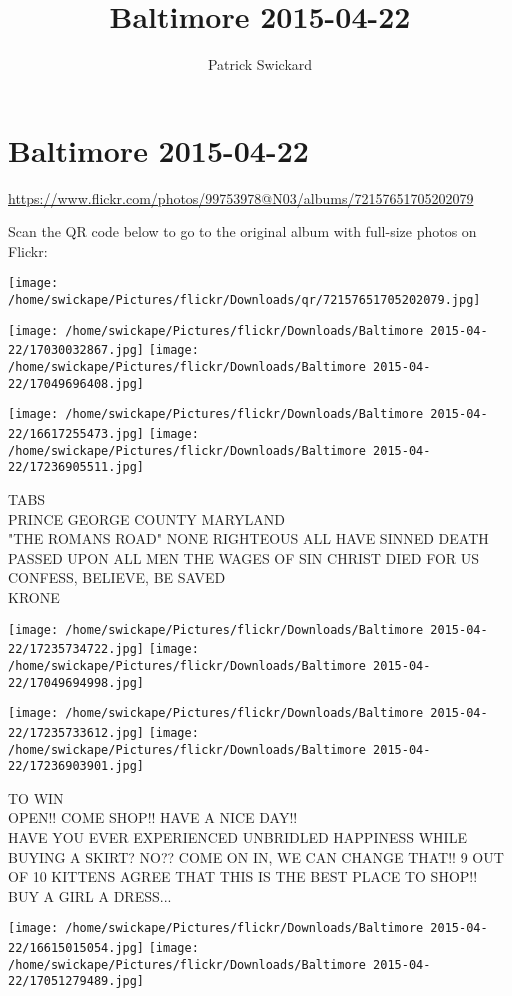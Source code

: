\documentclass[10pt,letterpaper]{article}
\title{Baltimore 2015-04-22}
\author{Patrick Swickard}
\date{}
\begin{document}
\section*{Baltimore 2015-04-22}

\url{https://www.flickr.com/photos/99753978@N03/albums/72157651705202079}

Scan the QR code below to go to the original album with full-size photos on Flickr:

\texttt{[image: /home/swickape/Pictures/flickr/Downloads/qr/72157651705202079.jpg]}
\pagebreak

\texttt{[image: /home/swickape/Pictures/flickr/Downloads/Baltimore 2015-04-22/17030032867.jpg]}
\texttt{[image: /home/swickape/Pictures/flickr/Downloads/Baltimore 2015-04-22/17049696408.jpg]}

\texttt{[image: /home/swickape/Pictures/flickr/Downloads/Baltimore 2015-04-22/16617255473.jpg]}
\texttt{[image: /home/swickape/Pictures/flickr/Downloads/Baltimore 2015-04-22/17236905511.jpg]}

TABS\\
PRINCE GEORGE COUNTY MARYLAND\\
"THE ROMANS ROAD" NONE RIGHTEOUS ALL HAVE SINNED DEATH PASSED UPON ALL MEN THE WAGES OF SIN CHRIST DIED FOR US CONFESS, BELIEVE, BE SAVED\\
KRONE
\pagebreak

\texttt{[image: /home/swickape/Pictures/flickr/Downloads/Baltimore 2015-04-22/17235734722.jpg]}
\texttt{[image: /home/swickape/Pictures/flickr/Downloads/Baltimore 2015-04-22/17049694998.jpg]}

\texttt{[image: /home/swickape/Pictures/flickr/Downloads/Baltimore 2015-04-22/17235733612.jpg]}
\texttt{[image: /home/swickape/Pictures/flickr/Downloads/Baltimore 2015-04-22/17236903901.jpg]}

TO WIN\\
OPEN!!  COME SHOP!!  HAVE A NICE DAY!!\\
HAVE YOU EVER EXPERIENCED UNBRIDLED HAPPINESS WHILE BUYING A SKIRT?  NO??  COME ON IN, WE CAN CHANGE THAT!!  9 OUT OF 10 KITTENS AGREE THAT THIS IS THE BEST PLACE TO SHOP!!\\
BUY A GIRL A DRESS...
\pagebreak

\texttt{[image: /home/swickape/Pictures/flickr/Downloads/Baltimore 2015-04-22/16615015054.jpg]}
\texttt{[image: /home/swickape/Pictures/flickr/Downloads/Baltimore 2015-04-22/17051279489.jpg]}
\end{document}
